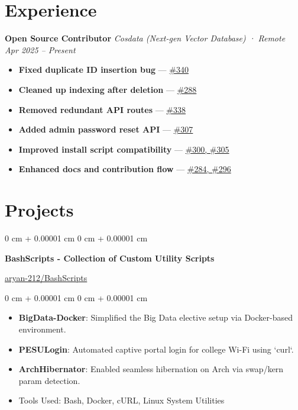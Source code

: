 \documentclass[10pt, letterpaper]{article}
\newenvironment{highlights}{
    \begin{itemize}[
        topsep=0.10 cm,
        parsep=0.10 cm,
        partopsep=0pt,
        itemsep=0pt,
        leftmargin=0 cm + 10pt
    ]
}{
    \end{itemize}
} %
\newenvironment{onecolentry}{
    \begin{adjustwidth}{
        0 cm + 0.00001 cm
    }{
        0 cm + 0.00001 cm
    }
}{
    \end{adjustwidth}
} %
\newenvironment{twocolentry}[2][]{
    \onecolentry
    \def\secondColumn{#2}
    \setcolumnwidth{\fill, 4.5 cm}
    \begin{paracol}{2}
}{
    \switchcolumn \raggedleft \secondColumn
    \end{paracol}
    \endonecolentry
} %
\begin{document}
\section{Experience}

\textbf{Open Source Contributor} \hfill \textit{Cosdata (Next-gen Vector Database) · Remote} \\
\textit{Apr 2025 – Present}
\vspace{-0.5em}
\begin{itemize}
  \setlength\itemsep{0.2em}
  \item \textbf{Fixed duplicate ID insertion bug} — \href{https://github.com/cosdata/cosdata/pull/340}{\#340}
  \item \textbf{Cleaned up indexing after deletion} — \href{https://github.com/cosdata/cosdata/pull/288}{\#288}
  \item \textbf{Removed redundant API routes} — \href{https://github.com/cosdata/cosdata/pull/338}{\#338}
  \item \textbf{Added admin password reset API} — \href{https://github.com/cosdata/cosdata/pull/307}{\#307}
  \item \textbf{Improved install script compatibility} — \href{https://github.com/cosdata/cosdata/pulls?q=is\%3Apr+author\%3Aaryan-212+shell}{\#300, \#305}
  \item \textbf{Enhanced docs and contribution flow} — \href{https://github.com/cosdata/cosdata/pulls?q=is\%3Apr+author\%3Aaryan-212+docs}{\#284, \#296}
\end{itemize}

\section{Projects}

\begin{twocolentry}{
    \href{https://github.com/aryan-212/BashScripts}{aryan-212/BashScripts}
}
    \textbf{BashScripts - Collection of Custom Utility Scripts}
\end{twocolentry}

\begin{onecolentry}
    \begin{highlights}
        \item \textbf{BigData-Docker}: Simplified the Big Data elective setup via Docker-based environment.
        \item \textbf{PESULogin}: Automated captive portal login for college Wi-Fi using `curl`.
        \item \textbf{ArchHibernator}: Enabled seamless hibernation on Arch via swap/kern param detection.
        \item Tools Used: Bash, Docker, cURL, Linux System Utilities
    \end{highlights}
\end{onecolentry}
\end{document}

